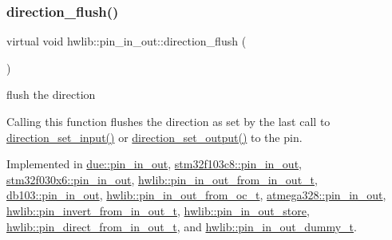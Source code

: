 \subsubsection{\texorpdfstring{direction\+\_\+flush()}{direction\_flush()}}
{\footnotesize\ttfamily virtual void hwlib\+::pin\+\_\+in\+\_\+out\+::direction\+\_\+flush (\begin{DoxyParamCaption}{ }\end{DoxyParamCaption})\hspace{0.3cm}{\ttfamily [pure virtual]}}

flush the direction

Calling this function flushes the direction as set by the last call to \hyperlink{classhwlib_1_1pin__in__out_a54ce1a5086d3c9e7b868511b1d46acd0}{direction\+\_\+set\+\_\+input()} or \hyperlink{classhwlib_1_1pin__in__out_ad08a5f5e9a4c3aadaa7c665b98f2418e}{direction\+\_\+set\+\_\+output()} to the pin. 

Implemented in \hyperlink{classdue_1_1pin__in__out_aa56ac6fe5ef886f6c88eb7562ecccfca}{due\+::pin\+\_\+in\+\_\+out}, \hyperlink{classstm32f103c8_1_1pin__in__out_ab174d020536c2572ac5a0875ed8af10e}{stm32f103c8\+::pin\+\_\+in\+\_\+out}, \hyperlink{classstm32f030x6_1_1pin__in__out_abb67031a092b24143ae7db116b876774}{stm32f030x6\+::pin\+\_\+in\+\_\+out}, \hyperlink{classhwlib_1_1pin__in__out__from__in__out__t_a68d7cb2826dbd2d36d4641e0b1d91c81}{hwlib\+::pin\+\_\+in\+\_\+out\+\_\+from\+\_\+in\+\_\+out\+\_\+t}, \hyperlink{classdb103_1_1pin__in__out_a9ec40785c38b923a6c5270e4435ad876}{db103\+::pin\+\_\+in\+\_\+out}, \hyperlink{classhwlib_1_1pin__in__out__from__oc__t_a906190c8ee6e6846235a33d98a258eb1}{hwlib\+::pin\+\_\+in\+\_\+out\+\_\+from\+\_\+oc\+\_\+t}, \hyperlink{classatmega328_1_1pin__in__out_a84bd2629cbf56882ae9cb986c928d33e}{atmega328\+::pin\+\_\+in\+\_\+out}, \hyperlink{classhwlib_1_1pin__invert__from__in__out__t_ac5480e6ca1a3e528e8f4e8ba3c946110}{hwlib\+::pin\+\_\+invert\+\_\+from\+\_\+in\+\_\+out\+\_\+t}, \hyperlink{classhwlib_1_1pin__in__out__store_ae26b3186167d3f10db2bb73573c366da}{hwlib\+::pin\+\_\+in\+\_\+out\+\_\+store}, \hyperlink{classhwlib_1_1pin__direct__from__in__out__t_ae9704d45e0a75261d126ca0409cda8c2}{hwlib\+::pin\+\_\+direct\+\_\+from\+\_\+in\+\_\+out\+\_\+t}, and \hyperlink{classhwlib_1_1pin__in__out__dummy__t_ad33911be9133dd967220eac92b232c78}{hwlib\+::pin\+\_\+in\+\_\+out\+\_\+dummy\+\_\+t}.

\mbox{\label{classhwlib_1_1pin__in__out_a54ce1a5086d3c9e7b868511b1d46acd0}} 

